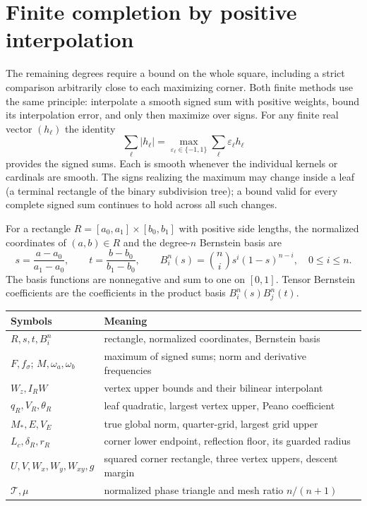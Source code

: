 \section{Finite completion by positive interpolation}
\label{sec:certificates}
The remaining degrees require a bound on the whole square, including a
strict comparison arbitrarily close to each maximizing corner. Both finite
methods use the same principle: interpolate a smooth signed sum with positive
weights, bound its interpolation error, and only then maximize over signs.
For any finite real vector $(h_\ell)$ the identity
\[
 \sum_\ell|h_\ell|=\max_{\varepsilon_\ell\in\{-1,1\}}
                         \sum_\ell\varepsilon_\ell h_\ell
\]
provides the signed sums. Each is smooth whenever the individual
kernels or cardinals are smooth. The signs realizing the maximum may
change inside a leaf (a terminal rectangle of the binary subdivision tree); a bound valid for every complete signed sum
continues to hold across all such changes.

For a rectangle $R=[a_0,a_1]\times[b_0,b_1]$ with positive side lengths,
the normalized coordinates of $(a,b)\in R$ and the degree-$n$
Bernstein basis are
\[
 s=\frac{a-a_0}{a_1-a_0},\qquad
 t=\frac{b-b_0}{b_1-b_0},\qquad
 B_i^n(s)=\binom ni s^i(1-s)^{n-i},\quad 0\leq i\leq n.
\]
The basis functions are nonnegative and sum to one on $[0,1]$.
Tensor Bernstein coefficients are the coefficients in the product
basis $B_i^n(s)B_j^n(t)$.

\begin{center}\small
\begin{tabular}{@{}ll@{}}\toprule
Symbols & Meaning\\\midrule
$R,s,t,B_i^n$ & rectangle, normalized coordinates, Bernstein basis\\
$F,f_\sigma$; $M,\omega_a,\omega_b$ & maximum of signed sums; norm and derivative frequencies\\
$W_z,I_RW$ & vertex upper bounds and their bilinear interpolant\\
$q_R,V_R,\theta_R$ & leaf quadratic, largest vertex upper, Peano coefficient\\
$M_*,E,V_E$ & true global norm, quarter-grid, largest grid upper\\
$L_c,\delta_R,r_R$ & corner lower endpoint, reflection floor, its guarded radius\\
$U,V,W_x,W_y,W_{xy},g$ & squared corner rectangle, three vertex uppers, descent margin\\
$\mathcal T,\mu$ & normalized phase triangle and mesh ratio $n/(n+1)$\\\bottomrule
\end{tabular}
\end{center}

